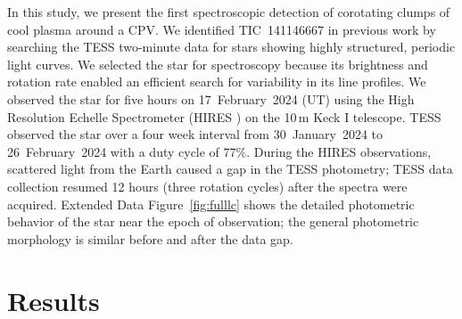 \documentclass{nature3}
\begin{document}
In this study, we present the first spectroscopic detection of
corotating clumps of cool plasma around a CPV.  We identified
TIC~141146667 in previous work \cite{Bouma2024} by searching the TESS
two-minute data \cite{Ricker2015} for stars showing highly structured,
periodic light curves.  We selected the star for spectroscopy because
its brightness and rotation rate enabled an efficient search for
variability in its line profiles.  We observed the star for five hours
on 17~February~2024 (UT) using the High Resolution Echelle
Spectrometer (HIRES \cite{vogt_hires_1994}) on the 10\,m Keck I
telescope.  TESS observed the star over a four week interval from
30~January~2024 to 26~February~2024 with a duty cycle of 77\%.  During
the HIRES observations, scattered light from the Earth caused a gap in
the TESS photometry; TESS data collection resumed 12 hours (three
rotation cycles) after the spectra were acquired.  Extended Data
Figure~\ref{fig:fulllc} shows the detailed photometric behavior of the
star near the epoch of observation; the general photometric morphology
is similar before and after the data gap.


\section{Results}
\end{document}
